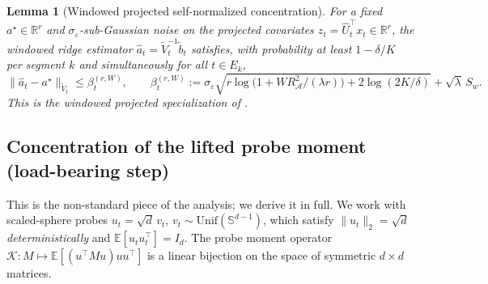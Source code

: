 \documentclass{article}
\newcommand{\R}{\mathbb{R}}
\newcommand{\E}{\mathbb{E}}
\newcommand{\cA}{\mathcal{A}}
\newtheorem{lemma}[theorem]{Lemma}
\begin{document}
\begin{lemma}[Windowed projected self-normalized concentration]
\label{lem:self_norm}
For a fixed $a^\star\in\R^r$ and $\sigma_\varepsilon$-sub-Gaussian
noise on the projected covariates $z_t=\widehat U_t^\top x_t\in\R^r$,
the windowed ridge estimator
$\widehat a_t=\widetilde V_t^{-1}\widetilde b_t$ satisfies, with
probability at least $1-\delta/K$ per segment $k$ and simultaneously
for all $t\in E_k$,
\[
\|\widehat a_t-a^\star\|_{\widetilde V_t}\le \beta_t^{(r,W)},
\qquad
\beta_t^{(r,W)} := \sigma_\varepsilon\sqrt{r\log\bigl(1+WR_\cA^2/(\lambda r)\bigr)+2\log(2K/\delta)}+\sqrt\lambda\,S_w.
\]
This is the windowed projected specialization of
\citet[Thm.~1,~2]{abbasi2011improved}.
\end{lemma}

\subsection{Concentration of the lifted probe moment (load-bearing step)}
\label{app:concentration_proof}

This is the non-standard piece of the analysis; we derive it in full.
We work with scaled-sphere probes $u_t = \sqrt d\,v_t$,
$v_t\sim\mathrm{Unif}(\mathbb S^{d-1})$, which satisfy
$\|u_t\|_2 = \sqrt d$ \emph{deterministically} and $\E[u_tu_t^\top] = I_d$.
The probe moment operator
$\mathcal K: M\mapsto\E[(u^\top Mu)uu^\top]$ is a linear bijection
on the space of symmetric $d\times d$ matrices.
\end{document}
